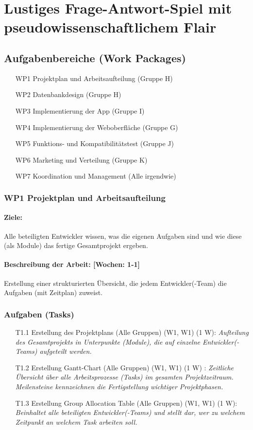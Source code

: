 \documentclass{report}
\begin{document}
\chapter{Lustiges Frage-Antwort-Spiel mit pseudowissenschaftlichem Flair}


\section*{Aufgabenbereiche (Work Packages)}

\begin{enumerate}
\item [WP1] Projektplan und Arbeitsaufteilung (Gruppe H)
\item [WP2] Datenbankdesign (Gruppe H)
\item [WP3] Implementierung der App (Gruppe I)
\item [WP4] Implementierung der Weboberfläche (Gruppe G)
\item [WP5] Funktions- und Kompatibilitätstest (Gruppe J)
\item [WP6] Marketing und Verteilung (Gruppe K)
\item [WP7] Koordination und Management (Alle irgendwie)
\end{enumerate}


\subsection*{WP1 Projektplan und Arbeitsaufteilung}

\subsubsection{Ziele:} Alle beteiligten Entwickler wissen, was die eigenen Aufgaben sind und wie diese (als Module) das fertige Gesamtprojekt ergeben.
\subsubsection{Beschreibung der Arbeit: [Wochen: 1-1]} Erstellung einer strukturierten Übersicht, die jedem Entwickler(-Team) die Aufgaben (mit Zeitplan) zuweist.

\subsection*{Aufgaben (Tasks)}

\begin{enumerate}
\item [T1.1] Erstellung des Projektplans (Alle Gruppen) (W1, W1) (1 W): \emph{ Aufteilung des Gesamtprojekts in Unterpunkte (Module), die auf einzelne Entwickler(-Teams) aufgeteilt werden.}
\item [T1.2] Erstellung Gantt-Chart (Alle Gruppen) (W1, W1) (1 W) : \emph{ Zeitliche Übersicht über alle Arbeitsprozesse (Tasks) im gesamten Projektzeitraum. Meilensteine kennzeichnen die Fertigstellung wichtiger Projektphasen.}
\item [T1.3] Erstellung Group Allocation Table (Alle Gruppen) (W1, W1) (1 W): \emph{ Beinhaltet alle beteiligten Entwickler(-Teams) und stellt dar, wer zu welchem Zeitpunkt an welchem Task arbeiten soll.}
\end{enumerate}
\end{document}
